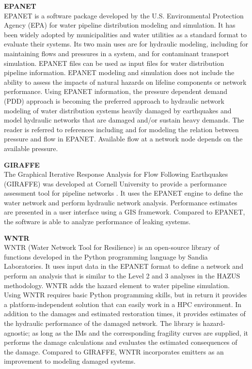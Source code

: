 \noindent\textbf{EPANET} \\EPANET is a software package developed by the U.S. Environmental Protection Agency (EPA) for water pipeline distribution modeling and simulation. It has been widely adopted by municipalities and water utilities as a standard format to evaluate their systems. Its two main uses are for hydraulic modeling, including for maintaining flows and pressures in a system, and for contaminant transport simulation. EPANET files can be used as input files for water distribution pipeline information. EPANET modeling and simulation does not include the ability to assess the impacts of natural hazards on lifeline components or network performance. Using EPANET information, the pressure dependent demand (PDD) approach is becoming the preferred approach to hydraulic network modeling of water distribution systems heavily damaged by earthquakes and model hydraulic networks that are damaged and/or sustain heavy demands. The reader is referred to references including \cite{jun2013iterative} and \cite{sayyed2014modelling} for modeling the relation between pressure and flow in EPANET. Available flow at a network node depends on the available pressure.
\newline

\noindent\textbf{GIRAFFE} \\The Graphical Iterative Response Analysis for Flow Following Earthquakes (GIRAFFE) was developed at Cornell University to provide a performance assessment tool for pipeline networks \citep{wang2008seismic}. It uses the EPANET engine to define the water network and perform hydraulic network analysis. Performance estimates are presented in a user interface using a GIS framework. Compared to EPANET, the software is able to analyze performance of leaking systems.
\newline

\noindent\textbf{WNTR} \\WNTR (Water Network Tool for Resilience) is an open-source library of functions developed in the Python programming language by Sandia Laboratories. It uses input data in the EPANET format to define a network and perform an analysis that is similar to the Level 2 and 3 analyses in the HAZUS methodology. WNTR adds the hazard element to water pipeline simulation. Using WNTR requires basic Python programming skills, but in return it provides a platform-independent solution that can easily work in a HPC environment. In addition to the damages and estimated restoration times, it provides estimates of the hydraulic performance of the damaged network. The library is hazard-agnostic; as long as the IMs and the corresponding fragility curves are supplied, it performs the damage calculations and evaluates the estimated consequences of the damage. Compared to GIRAFFE, WNTR incorporates emitters as an improvement to modeling damaged systems.
\newline

